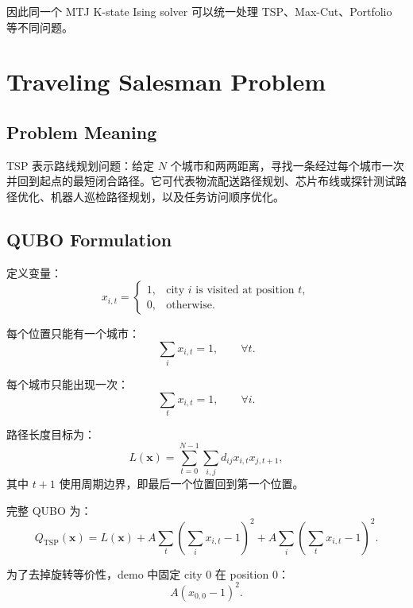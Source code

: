 \documentclass[UTF8]{ctexart}
\begin{document}
因此同一个 MTJ K-state Ising solver 可以统一处理 TSP、Max-Cut、Portfolio 等不同问题。

\section{Traveling Salesman Problem}

\subsection{Problem Meaning}

TSP 表示路线规划问题：给定 $N$ 个城市和两两距离，寻找一条经过每个城市一次并回到起点的最短闭合路径。它可代表物流配送路径规划、芯片布线或探针测试路径优化、机器人巡检路径规划，以及任务访问顺序优化。

\subsection{QUBO Formulation}

定义变量：
\begin{equation}
x_{i,t} =
\begin{cases}
1, & \text{city } i \text{ is visited at position } t,\\
0, & \text{otherwise}.
\end{cases}
\end{equation}

每个位置只能有一个城市：
\begin{equation}
\sum_i x_{i,t}=1,\qquad \forall t.
\end{equation}

每个城市只能出现一次：
\begin{equation}
\sum_t x_{i,t}=1,\qquad \forall i.
\end{equation}

路径长度目标为：
\begin{equation}
L(\bm{x})
=
\sum_{t=0}^{N-1}
\sum_{i,j}
d_{ij}x_{i,t}x_{j,t+1},
\end{equation}
其中 $t+1$ 使用周期边界，即最后一个位置回到第一个位置。

完整 QUBO 为：
\begin{equation}
Q_{\mathrm{TSP}}(\bm{x})
=
L(\bm{x})
+
A\sum_t
\left(
\sum_i x_{i,t}-1
\right)^2
+
A\sum_i
\left(
\sum_t x_{i,t}-1
\right)^2.
\end{equation}

为了去掉旋转等价性，demo 中固定 city 0 在 position 0：
\begin{equation}
A(x_{0,0}-1)^2.
\end{equation}
\end{document}
